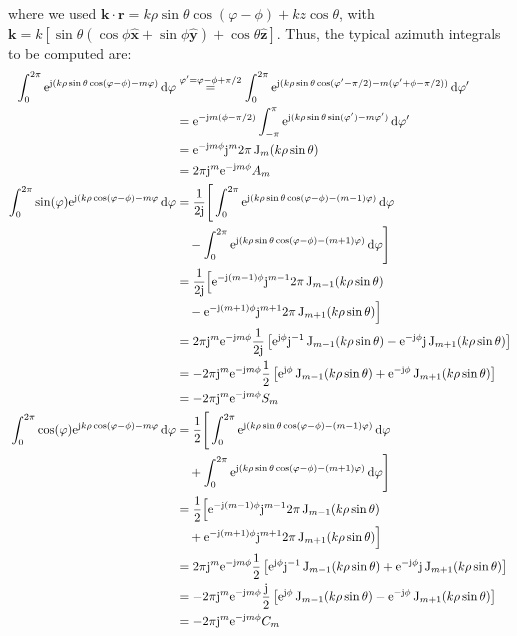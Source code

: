 \documentclass[a4paper,12pt]{article}
\renewcommand{\vec}[1]{\boldsymbol{#1}}
\newcommand{\unitvec}[1]{\hat{\vec{#1}}}
\newcommand{\mrm}[1]{\mathrm{#1}}
\newcommand{\diff}{\operatorname{d}\!}
\newcommand{\ju}{\mrm{j}}
\newcommand{\eu}{\mrm{e}}
\newcommand{\rv}{\vec{r}}
\newcommand{\kv}{\vec{k}}
\newcommand{\xuv}{\unitvec{x}}
\newcommand{\yuv}{\unitvec{y}}
\newcommand{\zuv}{\unitvec{z}}
\newcommand{\BesselJ}{\operatorname{J}}
\begin{document}
where we used
$\kv\cdot\rv = k\rho\sin\theta\cos(\varphi-\phi) + kz\cos\theta$, with
$\kv = k[\sin\theta(\cos\phi\xuv + \sin\phi\yuv) + \cos\theta\zuv]$.
Thus, the typical azimuth integrals to be computed are:
\begin{align}
  \int_{0}^{2\pi} \eu^{\ju(k\rho\sin\theta\cos(\varphi-\phi) - m\varphi)} \diff\varphi
  &\stackrel{\varphi'=\varphi-\phi+\pi/2}{=} \int_{0}^{2\pi} \eu^{\ju(k\rho\sin\theta\cos(\varphi'-\pi/2) - m(\varphi'+\phi-\pi/2))} \diff\varphi' \notag \\
  &= \eu^{-\ju m(\phi-\pi/2)} \int_{-\pi}^{\pi} \eu^{\ju(k\rho\sin\theta\sin(\varphi') - m\varphi')} \diff\varphi' \notag \\
  &= \eu^{-\ju m\phi} \ju^{m}2\pi\BesselJ_{m}(k\rho\sin\theta) \notag \\
  &= 2\pi\ju^{m}\eu^{-\ju m\phi}A_{m} \\
  \int_{0}^{2\pi} \sin(\varphi)\eu^{\ju(k\rho\cos(\varphi-\phi) - m\varphi} \diff\varphi &= \frac{1}{2\ju} \Bigg[ \int_{0}^{2\pi} \eu^{\ju(k\rho\sin\theta\cos(\varphi-\phi) - (m-1)\varphi)} \diff\varphi \notag \\
  &\quad - \int_{0}^{2\pi} \eu^{\ju(k\rho\sin\theta\cos(\varphi-\phi) - (m+1)\varphi)} \diff\varphi \Bigg] \notag \\
  &= \frac{1}{2\ju} \Big[ \eu^{-\ju(m-1)\phi}\ju^{m-1}2\pi\BesselJ_{m-1}(k\rho\sin\theta) \notag \\
  &\quad - \eu^{-\ju(m+1)\phi}\ju^{m+1}2\pi\BesselJ_{m+1}(k\rho\sin\theta) \Big] \notag \\
  &= 2\pi\ju^{m}\eu^{-\ju m\phi} \frac{1}{2\ju}\left[ \eu^{\ju\phi}\ju^{-1}\BesselJ_{m-1}(k\rho\sin\theta) - \eu^{-\ju\phi}\ju\BesselJ_{m+1}(k\rho\sin\theta) \right] \notag \\
  &= -2\pi\ju^{m}\eu^{-\ju m\phi} \frac{1}{2}\left[ \eu^{\ju\phi}\BesselJ_{m-1}(k\rho\sin\theta) + \eu^{-\ju\phi}\BesselJ_{m+1}(k\rho\sin\theta) \right] \notag \\
  &= -2\pi\ju^{m}\eu^{-\ju m\phi}S_{m} \\
  \int_{0}^{2\pi} \cos(\varphi)\eu^{\ju k\rho\cos(\varphi-\phi) - m\varphi} \diff\varphi &= \frac{1}{2} \Bigg[ \int_{0}^{2\pi} \eu^{\ju(k\rho\sin\theta\cos(\varphi-\phi) - (m-1)\varphi)} \diff\varphi \notag \\
  &\quad + \int_{0}^{2\pi} \eu^{\ju(k\rho\sin\theta\cos(\varphi-\phi) - (m+1)\varphi)} \diff\varphi \Bigg] \notag \\
  &= \frac{1}{2} \Big[ \eu^{-\ju(m-1)\phi}\ju^{m-1}2\pi\BesselJ_{m-1}(k\rho\sin\theta) \notag \\
  &\quad + \eu^{-\ju(m+1)\phi}\ju^{m+1}2\pi\BesselJ_{m+1}(k\rho\sin\theta) \Big] \notag \\
  &= 2\pi\ju^{m}\eu^{-\ju m\phi} \frac{1}{2} \left[ \eu^{\ju\phi}\ju^{-1}\BesselJ_{m-1}(k\rho\sin\theta) + \eu^{-\ju\phi}\ju\BesselJ_{m+1}(k\rho\sin\theta) \right] \notag \\
  &= -2\pi\ju^{m}\eu^{-\ju m\phi} \frac{\ju}{2} \left[ \eu^{\ju\phi}\BesselJ_{m-1}(k\rho\sin\theta) - \eu^{-\ju\phi}\BesselJ_{m+1}(k\rho\sin\theta) \right] \notag \\
  &= -2\pi\ju^{m}\eu^{-\ju m\phi}C_{m}
\end{align}
\end{document}
